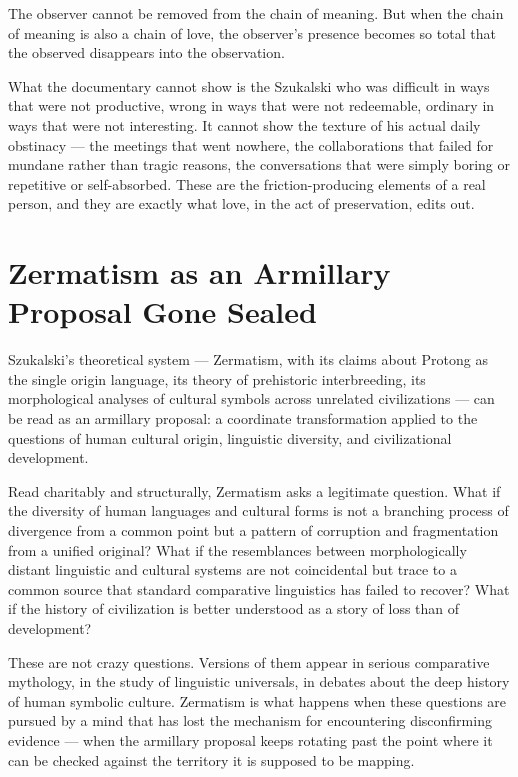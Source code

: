 \documentclass[11pt, a4paper]{article}
\theoremstyle{named}
\begin{document}
\begin{keybox}
The observer cannot be removed from the chain of meaning. But when
the chain of meaning is also a chain of love, the observer's
presence becomes so total that the observed disappears into the
observation.
\end{keybox}

What the documentary cannot show is the Szukalski who was difficult
in ways that were not productive, wrong in ways that were not
redeemable, ordinary in ways that were not interesting. It cannot
show the texture of his actual daily obstinacy — the meetings that
went nowhere, the collaborations that failed for mundane rather than
tragic reasons, the conversations that were simply boring or
repetitive or self-absorbed. These are the friction-producing elements
of a real person, and they are exactly what love, in the act of
preservation, edits out.

\section{Zermatism as an Armillary Proposal Gone Sealed}

Szukalski's theoretical system — Zermatism, with its claims about
Protong as the single origin language, its theory of prehistoric
interbreeding, its morphological analyses of cultural symbols across
unrelated civilizations — can be read as an armillary proposal: a
coordinate transformation applied to the questions of human cultural
origin, linguistic diversity, and civilizational development.

Read charitably and structurally, Zermatism asks a legitimate
question. What if the diversity of human languages and cultural forms
is not a branching process of divergence from a common point but a
pattern of corruption and fragmentation from a unified original? What
if the resemblances between morphologically distant linguistic and
cultural systems are not coincidental but trace to a common source
that standard comparative linguistics has failed to recover? What if
the history of civilization is better understood as a story of loss
than of development?

These are not crazy questions. Versions of them appear in serious
comparative mythology, in the study of linguistic universals, in
debates about the deep history of human symbolic culture. Zermatism
is what happens when these questions are pursued by a mind that has
lost the mechanism for encountering disconfirming evidence — when the
armillary proposal keeps rotating past the point where it can be
checked against the territory it is supposed to be mapping.
\end{document}

